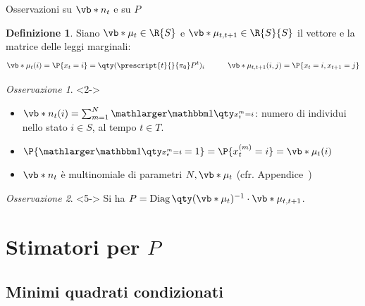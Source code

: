 \documentclass[10pt,xcolor={table,dvipsnames}]{beamer} 		%
\theoremstyle{plain}					%
\theoremstyle{definition}
\newtheorem*{definizione*}{Definizione}	%
\theoremstyle{remark}
\newtheorem*{oss*}{Osservazione}
\newcommand{\transpose}[1]{\prescript{t}{}{#1}}
\begin{document}
	\begin{frame}
		{\hypertarget{frame:dettagli_nt}{Osservazioni su $\vb*{n}_t$ e su $P$}}
		\begin{definizione*}
			Siano $\vb*{\mu}_t\in\R{S}$ e $\vb*{\mu}_{t,t+1}\in\R{S}{S}$ il vettore e la matrice
			delle leggi marginali:
			\vspace*{-0.5\baselineskip}
			\[\begin{aligned}
				\vb*{\mu}_t(i)=\P{x_t=i}=\qty(\transpose{\pi_0}P^t)_i & \qquad & \vb*{\mu}_{t,t+1}(i,j)=\P{x_t=i,x_{t+1}=j}\\
			\end{aligned}\]
		\end{definizione*}

		\begin{oss*}<2->
			\begin{itemize}
				\item<2-> $\vb*{n}_t(i)=\sum_{m=1}^N\indicator$: numero di individui nello stato $i\in S$,
				al tempo $t\in T$.
				\item<3-> $\P{\indicator =1}=\P{x_t^{(m)}=i}=\vb*{\mu}_t(i)$
				\item<4-> $\vb*{n}_t$ è multinomiale di parametri $N,\vb*{\mu}_t$
				(cfr. Appendice~\hyperlink{frame:dettagli_nt:appendice}{\faHandPointRight})
			\end{itemize}
		\end{oss*}

		\begin{oss*}<5->
			Si ha $P=\operatorname{Diag}\qty(\vb*{\mu}_t)^{-1}\cdot\vb*{\mu}_{t,t+1}$.

		\end{oss*}

	\end{frame}



\section{Stimatori per \texorpdfstring{$P$}{P}}
	\subsection{Minimi quadrati condizionati}
\end{document}
